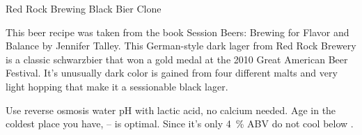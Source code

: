 \begin{recipe}{Red Rock Brewing Black Bier Clone}

\begin{aboutblock}
This beer recipe was taken from the book Session Beers: Brewing for Flavor and
Balance by Jennifer Talley. This German-style dark lager from Red Rock Brewery
is a classic schwarzbier that won a gold medal at the 2010 Great American Beer
Festival. It's unusually dark color is gained from four different malts and very
light hopping that make it a sessionable black lager. \sourceaha
\end{aboutblock}


\begin{methodandtiming}
 
\begin{mashsteps}
\end{mashsteps}

\begin{fermentationsteps}
\end{fermentationsteps}

\begin{directions}
Use reverse osmosis water pH with lactic acid, no calcium needed.
Age in the coldest place you have, -- is optimal. Since it's
only 4~\% ABV do not cool below .
\end{directions}

\end{methodandtiming}

\recipebreak

\begin{ingredientsblock}

\begin{malts}
\end{malts}

\begin{hops}
\end{hops}


\end{ingredientsblock}

\end{recipe}
